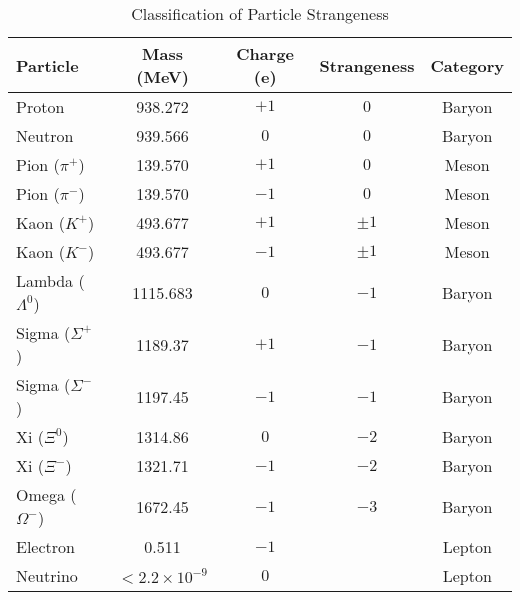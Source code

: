\begin{table}[htbp]
	\centering
	\label{tab:strangeness-classification}
	\begin{tabular}{lcccc}
		\toprule
		\textbf{Particle} & \textbf{Mass (MeV)} & \textbf{Charge (e)} & \textbf{Strangeness} & \textbf{Category} \\
		\midrule
		Proton & 938.272 & $+1$ & $0$ & Baryon \\
		Neutron & 939.566 & $0$ & $0$ & Baryon \\
		\midrule
		Pion ($\pi^+$) & 139.570 & $+1$ & $0$ & Meson \\
		Pion ($\pi^-$) & 139.570 & $-1$ & $0$ & Meson \\
		\midrule
		Kaon ($K^+$) & 493.677 & $+1$ & $\pm1$ & Meson \\
		Kaon ($K^-$) & 493.677 & $-1$ & $\pm1$ & Meson \\
		\midrule
		Lambda ($\Lambda^0$) & 1115.683 & $0$ & $-1$ & Baryon \\
		\midrule
		Sigma ($\Sigma^+$) & 1189.37 & $+1$ & $-1$ & Baryon \\
		Sigma ($\Sigma^-$) & 1197.45 & $-1$ & $-1$ & Baryon \\
		\midrule
		Xi ($\Xi^0$) & 1314.86 & $0$ & $-2$ & Baryon \\
		Xi ($\Xi^-$) & 1321.71 & $-1$ & $-2$ & Baryon \\
		\midrule
		Omega ($\Omega^-$) & 1672.45 & $-1$ & $-3$ & Baryon \\
		\midrule
		Electron & 0.511 & $-1$ &  & Lepton \\
		Neutrino & $<2.2 \times 10^{-9}$ & $0$ &  & Lepton \\
		\bottomrule
	\end{tabular}	
	\caption{Classification of Particle Strangeness}
\end{table}

